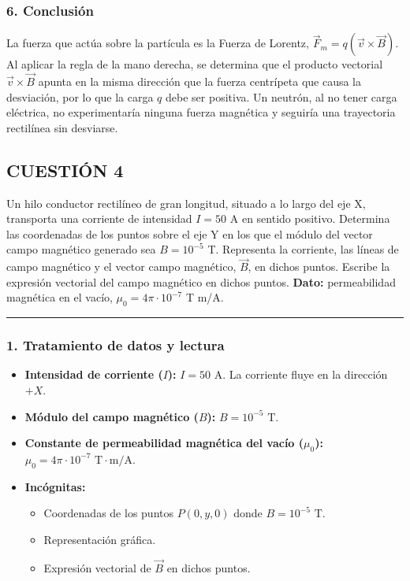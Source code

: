 \subsubsection*{6. Conclusión}
\begin{cajaconclusion}
La fuerza que actúa sobre la partícula es la Fuerza de Lorentz, $\vec{F}_m = q (\vec{v} \times \vec{B})$. Al aplicar la regla de la mano derecha, se determina que el producto vectorial $\vec{v} \times \vec{B}$ apunta en la misma dirección que la fuerza centrípeta que causa la desviación, por lo que la carga $q$ debe ser positiva. Un neutrón, al no tener carga eléctrica, no experimentaría ninguna fuerza magnética y seguiría una trayectoria rectilínea sin desviarse.
\end{cajaconclusion}

\newpage
\subsection{CUESTIÓN 4}
\label{subsec:C4_2024_jun_ord}

\begin{cajaenunciado}
Un hilo conductor rectilíneo de gran longitud, situado a lo largo del eje X, transporta una corriente de intensidad $I=50$ A en sentido positivo. Determina las coordenadas de los puntos sobre el eje Y en los que el módulo del vector campo magnético generado sea $B=10^{-5}$ T. Representa la corriente, las líneas de campo magnético y el vector campo magnético, $\vec{B}$, en dichos puntos. Escribe la expresión vectorial del campo magnético en dichos puntos.
\textbf{Dato:} permeabilidad magnética en el vacío, $\mu_{0}=4\pi\cdot10^{-7}$ T m/A.
\end{cajaenunciado}
\hrule

\subsubsection*{1. Tratamiento de datos y lectura}
\begin{itemize}
    \item \textbf{Intensidad de corriente ($I$):} $I = 50 \text{ A}$. La corriente fluye en la dirección $+X$.
    \item \textbf{Módulo del campo magnético ($B$):} $B = 10^{-5} \text{ T}$.
    \item \textbf{Constante de permeabilidad magnética del vacío ($\mu_0$):} $\mu_0 = 4\pi \cdot 10^{-7} \text{ T}\cdot\text{m}/\text{A}$.
    \item \textbf{Incógnitas:}
    \begin{itemize}
        \item Coordenadas de los puntos $P(0,y,0)$ donde $B = 10^{-5} \text{ T}$.
        \item Representación gráfica.
        \item Expresión vectorial de $\vec{B}$ en dichos puntos.
    \end{itemize}
\end{itemize}

